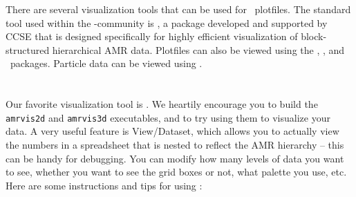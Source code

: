 There are several visualization tools that can be used for \amrex\
plotfiles.  The standard tool used within the
\amrex-community is \amrvis, a package developed and supported 
by CCSE that is designed specifically for highly efficient visualization
of block-structured hierarchical AMR data.
Plotfiles can also be viewed using the \visit, \paraview, and \yt\ packages.
Particle data can be viewed using \paraview.

\section{\amrvis}

Our favorite visualization tool is \amrvis. We heartily encourage you
to build the {\tt amrvis2d} and {\tt amrvis3d} executables, and to try using them
to visualize your data. A very useful feature is View/Dataset, which
allows you to actually view the numbers in a spreadsheet that is nested
to reflect the AMR hierarchy -- this can be handy for
debugging. You can modify how many levels of data you want to see,
whether you want to see the grid boxes or not, what palette you use,
etc.  Here are some instructions and tips for using \amrvis:

